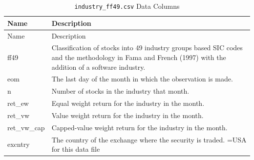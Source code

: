 \documentclass[12pt,title,fleqn]{article}
\begin{document}
{\scriptsize
	\begin{longtable}{@{\extracolsep{\fill}}|l|m{14.2cm}|@{}}
	\caption{\texttt{industry\_ff49.csv} Data Columns \label{industry_ff49}}\\
	
	\hline
	Name & Description \\
	\hline
	\endfirsthead
	
	\hline
	Name & Description \\
	\hline
	\endhead
	
	\hline
	\endfoot
	
	
	\hline\hline
	\endlastfoot
	
	ff49\rule{0pt}{10pt} & Classification of stocks into 49 industry groups based SIC codes and the methodology in Fama and French (1997) with the addition of a software industry. \\[1ex]
	
	eom & The last day of the month in which the observation is made. \\[1ex]

	n & Number of stocks in the industry that month. \\[1ex]

	ret\_ew & Equal weight return for the industry in the month.\\[1ex]

	ret\_vw & Value weight return for the industry in the month.\\[1ex]

	ret\_vw\_cap & Capped-value weight return for the industry in the month.\\[1ex]

	excntry & The country of the exchange where the security is traded. =USA for this data file \\[1ex]

\end{longtable}}
\end{document}
